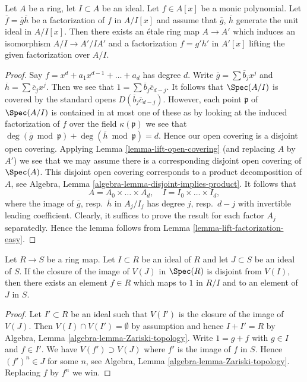 \begin{lemma}
\label{lemma-lift-factorization}
Let $A$ be a ring, let $I \subset A$ be an ideal.
Let $f \in A[x]$ be a monic polynomial.
Let $\overline{f} = \overline{g} \overline{h}$ be a factorization of $f$
in $A/I[x]$ and assume that  $\overline{g}$, $\overline{h}$ generate
the unit ideal in $A/I[x]$. Then there exists an \'etale ring map
$A \to A'$ which induces an isomorphism $A/I \to A'/IA'$ and a factorization
$f = g' h'$ in $A'[x]$ lifting the given factorization over $A/I$.
\end{lemma}

\begin{proof}
Say $f = x^d + a_1 x^{d - 1} + \ldots + a_d$ has degree $d$.
Write $\overline{g} = \sum \overline{b}_j x^j$ and
$\overline{h} = \sum \overline{c}_j x^j$. Then we see that
$1 = \sum \overline{b}_j \overline{c}_{d - j}$. It follows that
$\Spec(A/I)$ is covered by the standard opens
$D(\overline{b}_j \overline{c}_{d - j})$. However, each point
$\mathfrak p$ of $\Spec(A/I)$ is contained in at most one of these as
by looking at the induced factorization of $f$ over the field
$\kappa(\mathfrak p)$ we see that $\deg(\overline{g} \bmod \mathfrak p) +
\deg(\overline{h} \bmod \mathfrak p) = d$. Hence our open covering
is a disjoint open covering. Applying Lemma \ref{lemma-lift-open-covering}
(and replacing $A$ by $A'$) we see that we may assume there is a
corresponding disjoint open covering of $\Spec(A)$. This disjoint open
covering corresponds to a product decomposition of $A$, see
Algebra, Lemma \ref{algebra-lemma-disjoint-implies-product}. It follows that
$$
A = A_0 \times \ldots \times A_d,
\quad
I = I_0 \times \ldots \times I_d,
$$
where the image of $\overline{g}$, resp.\ $\overline{h}$ in $A_j/I_j$
has degree $j$, resp.\ $d - j$ with invertible leading coefficient.
Clearly, it suffices to prove the result for each factor $A_j$
separatedly. Hence the lemma follows from
Lemma \ref{lemma-lift-factorization-easy}.
\end{proof}

\begin{lemma}
\label{lemma-separate-image-closed-from-closed}
Let $R \to S$ be a ring map. Let $I \subset R$ be an ideal of $R$
and let $J \subset S$ be an ideal of $S$. If the closure of the image
of $V(J)$ in $\Spec(R)$ is disjoint from $V(I)$, then there exists
an element $f \in R$ which maps to $1$ in $R/I$ and to an element
of $J$ in $S$.
\end{lemma}

\begin{proof}
Let $I' \subset R$ be an ideal such that $V(I')$ is the closure of
the image of $V(J)$. Then $V(I) \cap V(I') = \emptyset$ by assumption
and hence $I + I' = R$ by
Algebra, Lemma \ref{algebra-lemma-Zariski-topology}.
Write $1 = g + f$ with $g \in I$ and $f \in I'$.
We have $V(f') \supset V(J)$ where $f'$ is the image of $f$ in $S$.
Hence $(f')^n \in J$ for some $n$, see
Algebra, Lemma \ref{algebra-lemma-Zariski-topology}.
Replacing $f$ by $f^n$ we win.
\end{proof}

